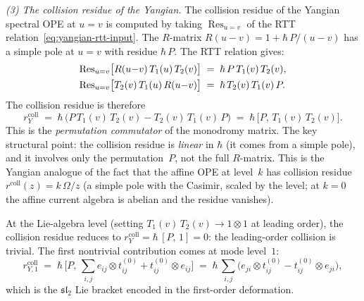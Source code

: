 \begin{computation}
\medskip
\noindent\emph{(3) The collision residue of the Yangian.}
The collision residue of the Yangian spectral OPE
at $u = v$ is computed by taking
$\operatorname{Res}_{u=v}$ of the
RTT relation~\eqref{eq:yangian-rtt-input}. The
$R$-matrix $R(u{-}v) = 1 + \hbar\,P/(u{-}v)$ has
a simple pole at $u = v$ with residue $\hbar\,P$.
The RTT relation gives:
\begin{align}
\operatorname{Res}_{u=v}\bigl[
R(u{-}v)\,T_1(u)\,T_2(v)\bigr]
&\;=\;
\hbar\,P\,T_1(v)\,T_2(v),
\notag\\
\operatorname{Res}_{u=v}\bigl[
T_2(v)\,T_1(u)\,R(u{-}v)\bigr]
&\;=\;
\hbar\,T_2(v)\,T_1(v)\,P.
\notag
\end{align}
The collision residue is therefore
\begin{equation}\label{eq:yangian-collision-residue}
r^{\mathrm{coll}}_Y
\;=\;
\hbar\,\bigl(P\,T_1(v)\,T_2(v)
- T_2(v)\,T_1(v)\,P\bigr)
\;=\;
\hbar\,\bigl[P,\,T_1(v)\,T_2(v)\bigr].
\end{equation}
This is the \emph{permutation commutator} of the
monodromy matrix. The key structural point: the
collision residue is \emph{linear} in $\hbar$ (it comes
from a simple pole), and it involves only the
permutation~$P$, not the full $R$-matrix. This is
the Yangian analogue of the fact that the affine OPE
at level~$k$ has collision residue $r^{\mathrm{coll}}(z) =
k\,\Omega/z$ (a simple pole with the Casimir, scaled by
the level; at $k=0$ the affine current algebra is abelian
and the residue vanishes).

At the Lie-algebra level
(setting $T_1(v)\,T_2(v) \to 1\otimes 1$ at leading
order), the collision residue reduces to
$r^{\mathrm{coll}}_Y = \hbar\,[P,\,1] = 0$:
the leading-order collision is trivial. The first
nontrivial contribution comes at mode level~$1$:
\begin{equation}\label{eq:yangian-collision-mode1}
r^{\mathrm{coll}}_{Y,1}
\;=\;
\hbar\,\bigl[P,\,
\sum_{i,j}e_{ij}\otimes t_{ij}^{(0)}
+ t_{ij}^{(0)}\otimes e_{ij}
\bigr]
\;=\;
\hbar\,\sum_{i,j}
\bigl(e_{ji}\otimes t_{ij}^{(0)}
- t_{ij}^{(0)}\otimes e_{ji}\bigr),
\end{equation}
which is the $\mathfrak{sl}_2$ Lie bracket encoded
in the first-order deformation.


\end{computation}
